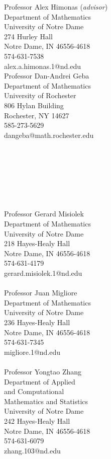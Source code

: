 \documentclass[11pt,oneside]{amsart}
\renewcommand{\section}[2]%
{\vspace{0.7cm}%
\hspace{0in}%
\marginpar{\scshape #1}#2}
\begin{document}
\section{References}
\vspace{-0.85cm}
\begin{multicols}{2}
Professor Alex Himonas (\textit{advisor}) \\
Department of Mathematics \\
University of Notre Dame  \\	
274 Hurley Hall \\
Notre Dame, IN 46556-4618	\\
574-631-7538  \\
alex.a.himonas.1@nd.edu \\

Professor Dan-Andrei Geba \\
Department of Mathematics \\ 
University of Rochester \\
806 Hylan Building \\ 
Rochester, NY 14627 \\ 
585-273-5629 \\
dangeba@math.rochester.edu \\
\\
\\
\\
\\
\\
\\
\\
Professor Gerard Misiolek \\
Department of Mathematics \\
University of Notre Dame \\
218 Hayes-Healy Hall \\
Notre Dame, IN 46556-4618 \\
574-631-4179 \\
gerard.misiolek.1@nd.edu \\
\\
Professor Juan Migliore \\
Department of Mathematics \\
University of Notre Dame \\
236 Hayes-Healy Hall \\
Notre Dame, IN 46556-4618 \\
574-631-7345\\
migliore.1@nd.edu\\
\newpage
\\
Professor Yongtao Zhang \\
Department of Applied \\ 
and Computational \\ 
Mathematics and Statistics  \\
University of Notre Dame \\
242 Hayes-Healy Hall \\
Notre Dame, IN 46556-4618 \\
574-631-6079 \\
zhang.103@nd.edu \\
\\
\\
\\
\\
\\
\\
\\
\end{multicols}
\end{document}
